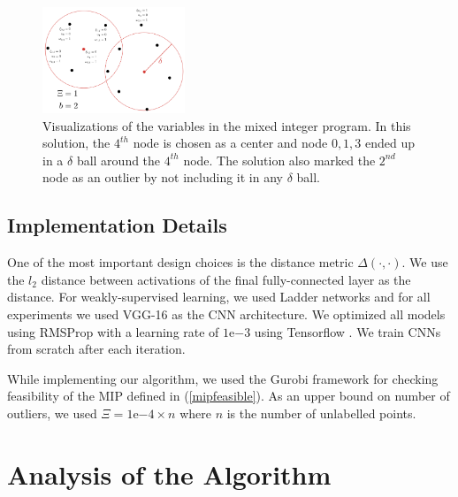 \documentclass{article}
\begin{document}
\begin{figure}
\vspace{-5mm}
  \begin{center}
\includegraphics[width=0.38\textwidth]{mip.pdf}
\end{center}
    \caption{Visualizations of the variables in the mixed integer program. In this solution, the $4^{th}$ node is chosen as a center and node $0,1,3$ ended up in a $\delta$ ball around the $4^{th}$ node. The solution also marked the $2^{nd}$ node as an outlier by not including it in any $\delta$ ball.}
\label{mip}
\vspace{-12mm}
\end{figure}



\subsection{Implementation Details}
\label{sec:imp}
One of the most important design choices is the distance metric $\Delta(\cdot,\cdot)$. We use the $l_2$ distance between activations of the final fully-connected layer as the distance. For weakly-supervised learning, we used Ladder networks \cite{ladder} and for all experiments we used VGG-16 \cite{vgg} as the CNN architecture. We optimized all models using RMSProp with a learning rate of $1\mathrm{e}{-3}$ using Tensorflow \cite{tensorflow}. We train CNNs from scratch after each iteration. %

While implementing our algorithm, we used the Gurobi \cite{gurobi} framework for checking feasibility of the MIP defined in (\ref{mipfeasible}). As an upper bound on number of outliers, we used $\Xi=1\mathrm{e}{-4} \times n$ where $n$ is the number of unlabelled points.

\section{Analysis of the Algorithm}
\label{sec:analysis}

\end{document}
